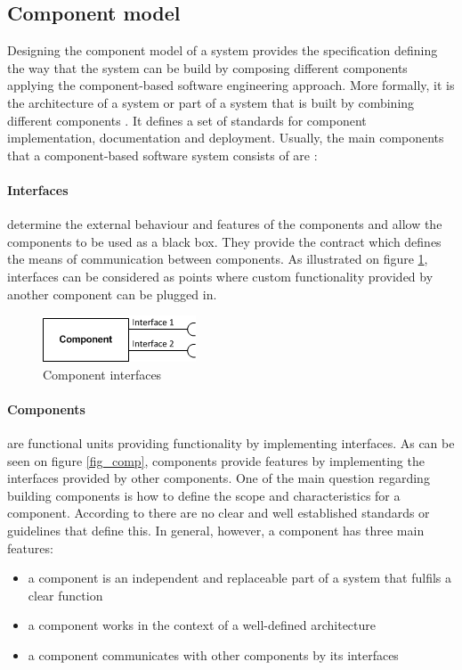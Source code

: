 \subsection{Component model}

Designing the component model of a system provides the specification defining the way that the system can be build by composing different components applying the component-based software engineering approach. More formally, it is the architecture of a system or part of a system that is built by combining different components \cite{Cai}. It defines a set of  standards for component implementation, documentation and deployment. Usually, the main components that a component-based software system consists of are \cite{Chen}:

\paragraph{Interfaces}
	determine the external behaviour and features of the components and allow the components to be used as a black box. They provide the contract which defines the means of communication between components. As illustrated on figure \ref{fig_intf}, interfaces can be considered as points where custom functionality provided by another component can be plugged in. 
	
	\begin{figure}[h!]
  		\centering
  		\includegraphics[scale=0.75]{plug-in/component-interfaces.png}
  		\caption{Component interfaces }
  		\label{fig_intf}
	\end{figure}

\paragraph{Components}
	are functional units providing functionality by implementing interfaces. As can be seen on figure \ref{fig_comp}, components provide  features by implementing the interfaces provided by other components. One of the main question regarding building components is how to define the scope and characteristics for a component. According to \cite{Cai} there are no clear and well established standards or guidelines that define this. In general, however, a component has three main features: 

\begin{itemize}
	\item a component is an independent and replaceable part of a system that fulfils a clear function
	\item a component works in the context of a well-defined architecture
	\item a component communicates with other components by its interfaces 
\end{itemize}

